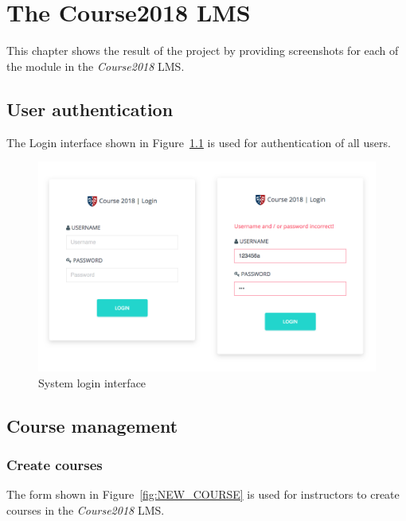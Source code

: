 

\chapter{The Course2018 LMS}
\label{chap:RSLT}

This chapter shows the result of the project by providing screenshots for
each of the module in the \emph{Course2018} LMS.

\section{User authentication}
The Login interface shown in Figure~\ref{fig:LOGIN} is used for authentication
of all users.
\begin{figure}[H]
    \centering
        \includegraphics[width=.8\textwidth]{figures/login}
    \caption{System login interface}
    \label{fig:LOGIN}
\end{figure}

\section{Course management}

\subsection{Create courses}
The form shown in Figure~\ref{fig:NEW_COURSE} is used for instructors to create
courses in the \emph{Course2018} LMS.

